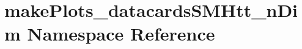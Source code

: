 \hypertarget{namespacemakePlots__datacardsSMHtt__nDim}{
\section{makePlots\_\-datacardsSMHtt\_\-nDim Namespace Reference}
\label{namespacemakePlots__datacardsSMHtt__nDim}
}
